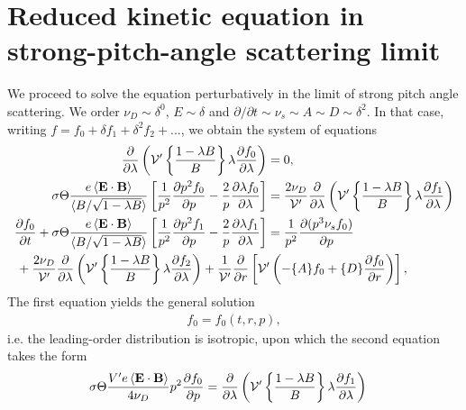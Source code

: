 \documentclass[11pt,a4paper]{article}
\renewcommand{\b}[1]{\ensuremath{ {\bf #1 } }}
\begin{document}
\section{Reduced kinetic equation in strong-pitch-angle scattering limit}
We proceed to solve the equation perturbatively in the limit of strong pitch angle scattering. We order $\nu_D \sim \delta^0$, $E \sim \delta$ and $\partial/\partial t \sim \nu_s \sim A \sim D \sim \delta^2$. In that case, writing $f=f_0+\delta f_1+\delta^2 f_2 + ...$, we obtain the system of equations
\begin{align}
\frac{\partial}{\partial \lambda}\left(  \mathcal{V'}\left\{\frac{1-\lambda B}{B}\right\} \lambda\frac{\partial f_0}{\partial \lambda}\right) &= 0, \\
\sigma \Theta \frac{e \left\langle \b{E}\cdot\b{B}\right\rangle}{\langle B/\sqrt{1-\lambda B} \rangle}\left[\frac{1}{p^2}\frac{\partial p^2 f_0}{\partial p}  - \frac{2}{p}\frac{\partial \lambda f_0}{\partial \lambda}\right] &=  \frac{2\nu_D}{\mathcal{V}'}\frac{\partial}{\partial \lambda}\left(  \mathcal{V'}\left\{\frac{1-\lambda B}{B}\right\} \lambda\frac{\partial f_1}{\partial \lambda}\right) \\
%
\frac{\partial f_0}{\partial t} + \sigma \Theta \frac{e \left\langle \b{E}\cdot\b{B}\right\rangle}{\langle B/\sqrt{1-\lambda B} \rangle}\left[\frac{1}{p^2}\frac{\partial p^2 f_1}{\partial p}  - \frac{2}{p}\frac{\partial \lambda f_1}{\partial \lambda}\right]  &= \frac{1}{p^2}\frac{\partial(p^3 \nu_s f_0)}{\partial p} \nonumber \\
&\hspace{-70mm}+ \frac{2\nu_D}{\mathcal{V}'}\frac{\partial}{\partial \lambda}\left(  \mathcal{V'}\left\{\frac{1-\lambda B}{B}\right\} \lambda\frac{\partial f_2}{\partial \lambda}\right)+\frac{1}{\mathcal{V}'}\frac{\partial}{\partial r}\left[ \mathcal{V'}\left(-\{A\}f_0+ \{D\}\frac{\partial f_0}{\partial r} \right) \right],
\end{align}
The first equation yields the general solution
\begin{align}
f_0 = f_0(t,r,p),
\end{align}
i.e. the leading-order distribution is isotropic, upon which the second equation takes the form
\begin{align}
\sigma \Theta \frac{V'e \left\langle \b{E}\cdot\b{B}\right\rangle}{4\nu_D}p^2\frac{\partial  f_0}{\partial p} &=  \frac{\partial}{\partial \lambda}\left(  \mathcal{V'}\left\{\frac{1-\lambda B}{B}\right\} \lambda\frac{\partial f_1}{\partial \lambda}\right) 
\end{align}
\end{document}
